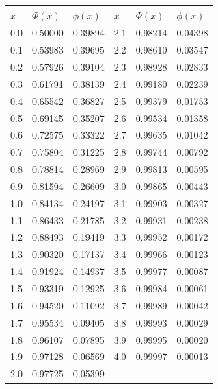 \documentclass[russian, 12pt, fleqn]{article}
\begin{document}
\newpage
\begin{tabular}[b]{ | l | l |  l || l | l |  l |}
\hline
$x$&$\Phi(x)$&$\phi(x)$&$x$&$\Phi(x)$&$\phi(x)$\\
\hline
0.0&0.50000&0.39894&2.1&0.98214&0.04398\\%
0.1&0.53983&0.39695&2.2&0.98610&0.03547\\%
0.2&0.57926&0.39104&2.3&0.98928&0.02833\\%
0.3&0.61791&0.38139&2.4&0.99180&0.02239\\%
0.4&0.65542&0.36827&2.5&0.99379&0.01753\\%
0.5&0.69145&0.35207&2.6&0.99534&0.01358\\%
0.6&0.72575&0.33322&2.7&0.99635&0.01042\\%
0.7&0.75804&0.31225&2.8&0.99744&0.00792\\%
0.8&0.78814&0.28969&2.9&0.99813&0.00595\\%
0.9&0.81594&0.26609&3.0&0.99865&0.00443\\%
1.0&0.84134&0.24197&3.1&0.99903&0.00327\\%
1.1&0.86433&0.21785&3.2&0.99931&0.00238\\%
1.2&0.88493&0.19419&3.3&0.99952&0.00172\\%
1.3&0.90320&0.17137&3.4&0.99966&0.00123\\%
1.4&0.91924&0.14937&3.5&0.99977&0.00087\\%
1.5&0.93319&0.12925&3.6&0.99984&0.00061\\%
1.6&0.94520&0.11092&3.7&0.99989&0.00042\\%
1.7&0.95534&0.09405&3.8&0.99993&0.00029\\%
1.8&0.96107&0.07895&3.9&0.99995&0.00020\\%
1.9&0.97128&0.06569&4.0&0.99997&0.00013\\%
2.0&0.97725&0.05399&     &              &             \\

\end{tabular}
\end{document}
